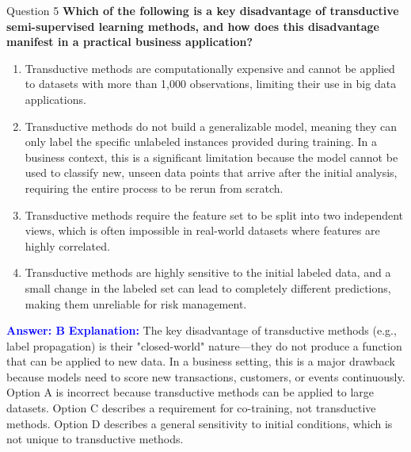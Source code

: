 \documentclass[8pt]{beamer}  %
\begin{document}
	\begin{frame}{Question 5}
		\textbf{Which of the following is a key disadvantage of transductive semi-supervised learning methods, and how does this disadvantage manifest in a practical business application?}
		\begin{enumerate}
			\item Transductive methods are computationally expensive and cannot be applied to datasets with more than 1,000 observations, limiting their use in big data applications.
			\item Transductive methods do not build a generalizable model, meaning they can only label the specific unlabeled instances provided during training. In a business context, this is a significant limitation because the model cannot be used to classify new, unseen data points that arrive after the initial analysis, requiring the entire process to be rerun from scratch.
			\item Transductive methods require the feature set to be split into two independent views, which is often impossible in real-world datasets where features are highly correlated.
			\item Transductive methods are highly sensitive to the initial labeled data, and a small change in the labeled set can lead to completely different predictions, making them unreliable for risk management.
		\end{enumerate}
		\vspace{0.2cm}
		\textcolor{blue}{\textbf{Answer: B}}
		\vspace{0.2cm}
		\textcolor{blue}{\textbf{Explanation:}} The key disadvantage of transductive methods (e.g., label propagation) is their "closed-world" nature—they do not produce a function that can be applied to new data. In a business setting, this is a major drawback because models need to score new transactions, customers, or events continuously. Option A is incorrect because transductive methods can be applied to large datasets. Option C describes a requirement for co-training, not transductive methods. Option D describes a general sensitivity to initial conditions, which is not unique to transductive methods.
	\end{frame}
	
\end{document}
